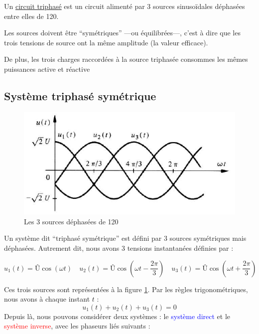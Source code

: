 \documentclass[12pt,a4paper]{article}
\newcommand{\U}{\text{Û} }
\begin{document}
\begin{blackbox}
	 Un \uline{circuit triphasé} est un circuit alimenté par 3 sources sinusoïdales déphasées entre elles de 120\degre. 
	
	Les sources doivent être ``symétriques'' ---ou équilibrées---, c'est à dire que les trois tensions de source ont la même amplitude (la valeur efficace). 
	
	De plus, les trois charges raccordées à la source triphasée consommes les mêmes puissances active et réactive
\end{blackbox}

\subsection[Triphasé symétrique]{Système triphasé symétrique}
\setcounter{equation}{0}
\begin{figure}
	\centering
	\includegraphics[scale=0.5]{images/triphase}
	\caption{Les 3 sources déphasées de 120\degre}
	\label{fig: trois sources dephasees}
\end{figure}
Un système dit ``triphasé symétrique'' est défini par 3 sources symétriques mais déphasées. Autrement dit, nous avons 3 tensions instantanées définies par :
\begin{boite}
	\begin{equation}
		u_1(t) = \U\cos(\omega t) \quad u_2(t) = \U\cos(\omega t - \frac{2\pi}{3}) \quad u_3(t) = \U\cos(\omega t + \frac{2\pi}{3})
	\end{equation}
\end{boite}
Ces trois sources sont représentées à la figure \ref{fig: trois sources dephasees}. Par les règles trigonométriques, nous avons à chaque instant $t$ :
\begin{equation}
	u_1(t) + u_2(t) + u_3(t) = 0
\end{equation}
Depuis là, nous pouvons considérer deux systèmes : le \textcolor{blue}{système direct} et le \textcolor{red}{système inverse}, avec les phaseurs liés suivants :
\end{document}
